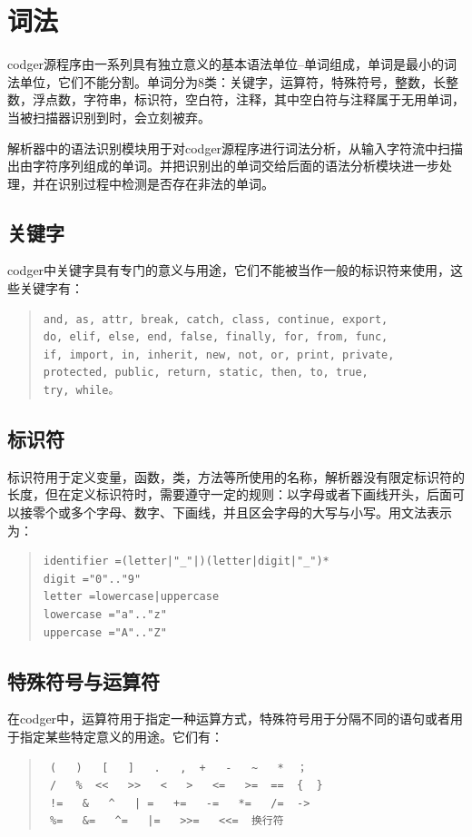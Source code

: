 \section{词法}
codger源程序由一系列具有独立意义的基本语法单位--单词组成，单词是最小的词法单位，它们不能分割。单词分为8类：关键字，运算符，特殊符号，整数，长整数，浮点数，字符串，标识符，空白符，注释，其中空白符与注释属于无用单词，当被扫描器识别到时，会立刻被弃。

解析器中的语法识别模块用于对codger源程序进行词法分析，从输入字符流中扫描出由字符序列组成的单词。并把识别出的单词交给后面的语法分析模块进一步处理，并在识别过程中检测是否存在非法的单词。
\subsection{关键字}
codger中关键字具有专门的意义与用途，它们不能被当作一般的标识符来使用，这些关键字有：
\begin{quote}
\begin{verbatim}
and, as, attr, break, catch, class, continue, export,
do, elif, else, end, false, finally, for, from, func, 
if, import, in, inherit, new, not, or, print, private, 
protected, public, return, static, then, to, true,
try, while。
\end{verbatim}
\end{quote}
\subsection{标识符}
标识符用于定义变量，函数，类，方法等所使用的名称，解析器没有限定标识符的长度，但在定义标识符时，需要遵守一定的规则：以字母或者下画线开头，后面可以接零个或多个字母、数字、下画线，并且区会字母的大写与小写。用文法表示为：
\begin{quote}
\begin{verbatim}
identifier =(letter|"_"|)(letter|digit|"_")*
digit ="0".."9"
letter =lowercase|uppercase
lowercase ="a".."z"
uppercase ="A".."Z"
\end{verbatim}
\end{quote}
\subsection{特殊符号与运算符}
在codger中，运算符用于指定一种运算方式，特殊符号用于分隔不同的语句或者用于指定某些特定意义的用途。它们有：
\begin{quote}
\begin{verbatim}
 (   )   [   ]   .   ,  +   -   ~   *  ；
 /   %  <<   >>   <   >   <=   >=  ==  {  }
 !=   &   ^   | =   +=   -=   *=   /=  ->
 %=   &=   ^=   |=   >>=   <<=  换行符
\end{verbatim}
\end{quote}
